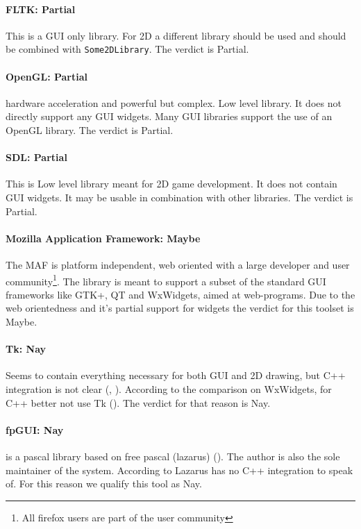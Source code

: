 \paragraph{FLTK: Partial} This is a GUI only library. For 2D a different library
should be used and should be combined with \verb!Some2DLibrary!. The verdict is
Partial.

\paragraph{OpenGL: Partial} hardware acceleration and powerful but complex. Low
level library. It does not directly support any GUI widgets. Many GUI libraries
support the use of an OpenGL library. The verdict is Partial.

\paragraph{SDL: Partial} This is Low level library meant for 2D game
development. It does not contain GUI widgets. It may be usable in combination
with other libraries. The verdict is Partial.

\paragraph{Mozilla Application Framework: Maybe} The MAF is platform
independent, web oriented with a large developer and user
community\footnote{All firefox users are part of the user community}.  The
library is meant to support a subset of the standard GUI frameworks like GTK+,
QT and WxWidgets, aimed at web-programs. Due to the web orientedness and it's
partial support for widgets the verdict for this toolset is Maybe.

\paragraph{Tk: Nay} Seems to contain everything necessary for both GUI and 2D
drawing, but C++ integration is not clear (\cite{wiki:tk}, \cite{tcltk:tk}).
According to the comparison on WxWidgets, for C++ better not use Tk
(\cite{wxwidget:comparison}).  The verdict for that reason is Nay.

\paragraph{fpGUI: Nay} is a pascal library based on free pascal (lazarus)
(\cite{Geldenhuys:fpgui}).  The author is also the sole maintainer of the
system. According to \cite{wxwidget:comparison} Lazarus has no C++ integration
to speak of. For this reason we qualify this tool as Nay. 

